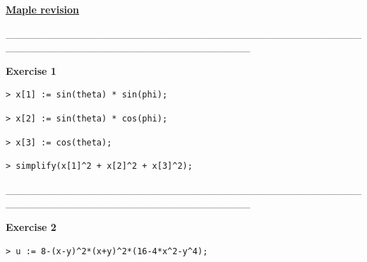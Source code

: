 \documentclass{article}
\begin{document}
\lstset{basicstyle=\ttfamily,breaklines=true,columns=flexible}
\pagestyle{empty}
\begin{center}
\begin{Maple Title}
\underline{\textbf{Maple revision}}
\end{Maple Title}
\end{center}
\begin{Maple Normal}
\_\_\_\_\_\_\_\_\_\_\_\_\_\_\_\_\_\_\_\_\_\_\_\_\_\_\_\_\_\_\_\_\_\_\_\_\_\_\_\_\_\_\_\_\_\_\_\_\_\_\_\_\_\_\_\_\_\_\_\_\_\_\_\_\_\_\_\_\_\_\_\_\_\_\_\_\_\_\_\_\_
\end{Maple Normal}
\begin{Maple Heading 2}
\textbf{Exercise 1}
\end{Maple Heading 2}
\begin{lstlisting}
> x[1] := sin(theta) * sin(phi);
\end{lstlisting}
\begin{lstlisting}
> x[2] := sin(theta) * cos(phi);
\end{lstlisting}
\begin{lstlisting}
> x[3] := cos(theta);
\end{lstlisting}
\begin{lstlisting}
> simplify(x[1]^2 + x[2]^2 + x[3]^2);
\end{lstlisting}
\begin{Maple Normal}
\_\_\_\_\_\_\_\_\_\_\_\_\_\_\_\_\_\_\_\_\_\_\_\_\_\_\_\_\_\_\_\_\_\_\_\_\_\_\_\_\_\_\_\_\_\_\_\_\_\_\_\_\_\_\_\_\_\_\_\_\_\_\_\_\_\_\_\_\_\_\_\_\_\_\_\_\_\_\_\_\_
\end{Maple Normal}
\begin{Maple Heading 2}
\textbf{Exercise 2}
\end{Maple Heading 2}
\begin{lstlisting}
> u := 8-(x-y)^2*(x+y)^2*(16-4*x^2-y^4);
\end{lstlisting}
\end{document}
